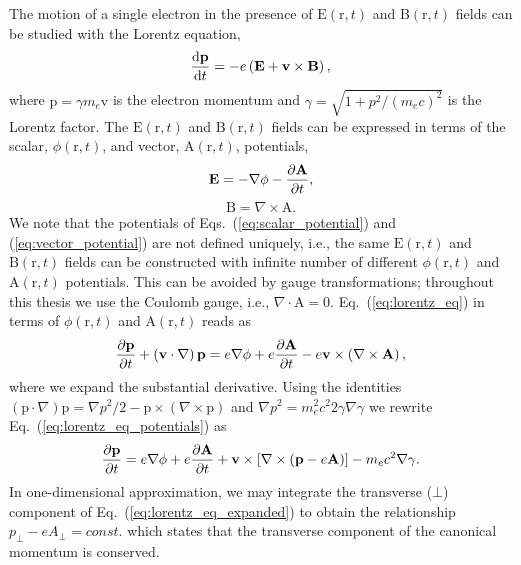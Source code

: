 \documentclass[10pt, a4paper, twoside, openright]{report}
\renewcommand{\vec}[1]{\boldsymbol{\mathrm{#1}}}
\newcommand{\rot}[1]{\nabla \times #1}
\newcommand{\grad}[1]{\nabla #1}
\renewcommand{\div}[1]{\nabla \cdot #1}
\begin{document}
The motion of a single electron in the presence of $ \vec{E} \left( \vec{r}, t \right) $ and $ \vec{B} \left( \vec{r}, t \right) $ fields can be studied with the Lorentz equation,
\begin{equation}\label{eq:lorentz_eq}
	\diff{\vec{p}}{t} = -e \left( \vec{E} + \vec{v} \times \vec{B} \right),
\end{equation}
where $ \vec{p} = \gamma m_e \vec{v} $ is the electron momentum and $ \gamma = \sqrt{1 + p^2 / \left( m_e c \right)^2 } $ is the Lorentz factor. The $ \vec{E} \left( \vec{r}, t \right) $ and $ \vec{B} \left( \vec{r}, t \right) $ fields can be expressed in terms of the scalar, $ \phi \left( \vec{r}, t \right) $, and vector, $ \vec{A} \left( \vec{r}, t \right) $, potentials,
\begin{equation}\label{eq:scalar_potential}
	\vec{E} = -\grad{\phi} - \diffp{\vec{A}}{t},
\end{equation}
\begin{equation}\label{eq:vector_potential}
	\vec{B} = \rot{\vec{A}}.
\end{equation}
We note that the potentials of Eqs.~(\ref{eq:scalar_potential}) and (\ref{eq:vector_potential}) are not defined uniquely, i.e., the same $ \vec{E} \left( \vec{r}, t \right) $ and $ \vec{B} \left( \vec{r}, t \right) $ fields can be constructed with infinite number of different $ \phi \left( \vec{r}, t \right) $ and $ \vec{A} \left( \vec{r}, t \right) $ potentials. This can be avoided by gauge transformations; throughout this thesis we use the Coulomb gauge, i.e., $ \div{\vec{A}} = 0 $. Eq.~(\ref{eq:lorentz_eq}) in terms of $ \phi \left( \vec{r}, t \right) $ and $ \vec{A} \left( \vec{r}, t \right) $ reads as
\begin{equation}\label{eq:lorentz_eq_potentials}
	\diffp{\vec{p}}{t} + \left(\vec{v} \cdot \grad \right) \vec{p} = e \grad{\phi} + e \diffp{\vec{A}}{t} - e \vec{v} \times \left( \rot{\vec{A}} \right),
\end{equation}
where we expand the substantial derivative. Using the identities $ \left(\vec{p} \cdot \grad{} \right) \vec{p} = \grad{p^2} / 2 - \vec{p} \times \left( \rot{\vec{p}} \right) $ and $ \grad{p^2} = m_e^2 c^2 2 \gamma \grad{\gamma} $ we rewrite Eq.~(\ref{eq:lorentz_eq_potentials}) as
\begin{equation}\label{eq:lorentz_eq_expanded}
	\diffp{\vec{p}}{t} = e \grad{\phi} + e \diffp{\vec{A}}{t} + \vec{v} \times \left[ \rot{\left(\vec{p} - e \vec{A} \right)} \right] - m_e c^2 \grad{\gamma}.
\end{equation}
In one-dimensional approximation, we may integrate the transverse ($ \bot $) component of Eq.~(\ref{eq:lorentz_eq_expanded}) to obtain the relationship $ p_{\bot} - e A_{\bot} = const. $ which states that the transverse component of the canonical momentum is conserved.
\end{document}

